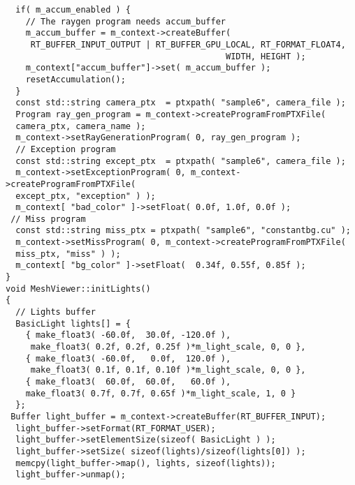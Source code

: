 \begin{verbatim}
  if( m_accum_enabled ) {
    // The raygen program needs accum_buffer
    m_accum_buffer = m_context->createBuffer(
     RT_BUFFER_INPUT_OUTPUT | RT_BUFFER_GPU_LOCAL, RT_FORMAT_FLOAT4,
                                            WIDTH, HEIGHT );
    m_context["accum_buffer"]->set( m_accum_buffer );
    resetAccumulation();
  }
  const std::string camera_ptx  = ptxpath( "sample6", camera_file );
  Program ray_gen_program = m_context->createProgramFromPTXFile( 
  camera_ptx, camera_name );
  m_context->setRayGenerationProgram( 0, ray_gen_program );
  // Exception program
  const std::string except_ptx  = ptxpath( "sample6", camera_file );
  m_context->setExceptionProgram( 0, m_context->createProgramFromPTXFile( 
  except_ptx, "exception" ) );
  m_context[ "bad_color" ]->setFloat( 0.0f, 1.0f, 0.0f );
 // Miss program 
  const std::string miss_ptx = ptxpath( "sample6", "constantbg.cu" );
  m_context->setMissProgram( 0, m_context->createProgramFromPTXFile( 
  miss_ptx, "miss" ) );
  m_context[ "bg_color" ]->setFloat(  0.34f, 0.55f, 0.85f );
}
void MeshViewer::initLights()
{
  // Lights buffer
  BasicLight lights[] = {
    { make_float3( -60.0f,  30.0f, -120.0f ),
     make_float3( 0.2f, 0.2f, 0.25f )*m_light_scale, 0, 0 },
    { make_float3( -60.0f,   0.0f,  120.0f ),
     make_float3( 0.1f, 0.1f, 0.10f )*m_light_scale, 0, 0 },
    { make_float3(  60.0f,  60.0f,   60.0f ), 
    make_float3( 0.7f, 0.7f, 0.65f )*m_light_scale, 1, 0 }
  };
 Buffer light_buffer = m_context->createBuffer(RT_BUFFER_INPUT);
  light_buffer->setFormat(RT_FORMAT_USER);
  light_buffer->setElementSize(sizeof( BasicLight ) );
  light_buffer->setSize( sizeof(lights)/sizeof(lights[0]) );
  memcpy(light_buffer->map(), lights, sizeof(lights));
  light_buffer->unmap();


\end{verbatim}
